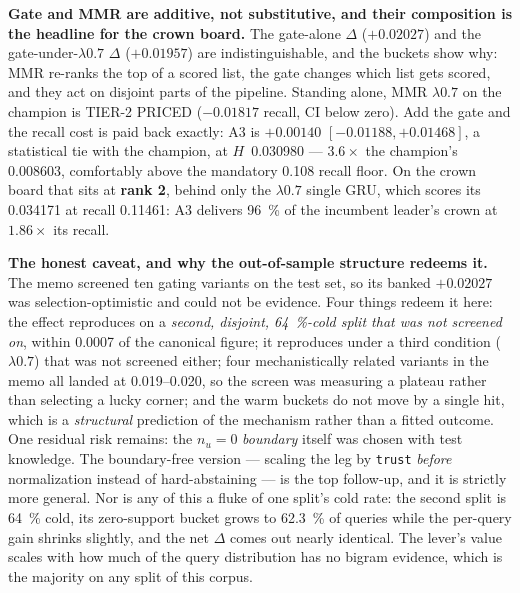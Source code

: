 \documentclass[11pt]{article}
\begin{document}
\textbf{Gate and MMR are additive, not substitutive, and their composition is the
headline for the crown board.} The gate-alone $\Delta$ ($+\num{0.02027}$) and the
gate-under-$\lambda\num{0.7}$ $\Delta$ ($+\num{0.01957}$) are
indistinguishable, and the buckets show why: MMR re-ranks the top of a scored list,
the gate changes which list gets scored, and they act on disjoint parts of the
pipeline. Standing alone, MMR $\lambda\num{0.7}$ on the champion is TIER-2 PRICED
($-\num{0.01817}$ recall, CI below zero). Add the gate and the recall cost is paid
back exactly: A3 is $+\num{0.00140}$ $[-\num{0.01188}, +\num{0.01468}]$, a
statistical tie with the champion, at $H$~\num{0.030980} --- $\num{3.6}\times$ the
champion's \num{0.008603}, comfortably above the mandatory \num{0.108} recall
floor. On the crown board that sits at \textbf{rank 2}, behind only the
$\lambda\num{0.7}$ single GRU, which scores its \num{0.034171} at recall
\num{0.11461}: A3 delivers \SI{96}{\percent} of the incumbent leader's crown at
$\num{1.86}\times$ its recall.

\textbf{The honest caveat, and why the out-of-sample structure redeems it.} The
memo screened ten gating variants on the test set, so its banked
$+\num{0.02027}$ was selection-optimistic and could not be evidence. Four things
redeem it here: the effect reproduces on a \emph{second, disjoint,
\SI{64}{\percent}-cold split that was not screened on}, within \num{0.0007} of the
canonical figure; it reproduces under a third condition ($\lambda\num{0.7}$) that
was not screened either; four mechanistically related variants in the memo all
landed at \numrange{0.019}{0.020}, so the screen was measuring a plateau rather
than selecting a lucky corner; and the warm buckets do not move by a single hit,
which is a \emph{structural} prediction of the mechanism rather than a fitted
outcome. One residual risk remains: the $n_u = 0$ \emph{boundary} itself was chosen
with test knowledge. The boundary-free version --- scaling the leg by
\texttt{trust} \emph{before} normalization instead of hard-abstaining --- is the top
follow-up, and it is strictly more general. Nor is any of this a fluke of one
split's cold rate: the second split is \SI{64}{\percent} cold, its zero-support
bucket grows to \SI{62.3}{\percent} of queries while the per-query gain shrinks
slightly, and the net $\Delta$ comes out nearly identical. The lever's value scales
with how much of the query distribution has no bigram evidence, which is the
majority on any split of this corpus.
\end{document}
